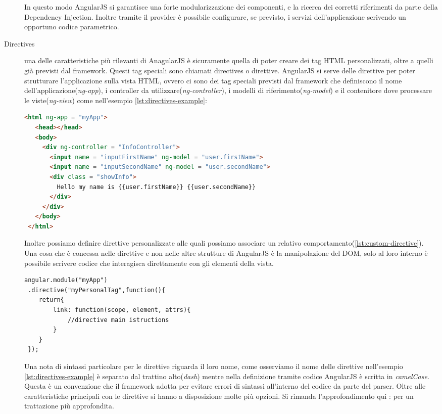 \begin{description}
In questo modo AngularJS si garantisce una forte modularizzazione dei componenti, e la ricerca dei corretti riferimenti da parte della Dependency Injection. Inoltre tramite il provider è possibile configurare, se previsto, i servizi dell'applicazione scrivendo un opportuno codice parametrico.

\item[Directives] una delle caratteristiche più rilevanti di AnagularJS è sicuramente quella di poter creare dei tag HTML personalizzati, oltre a quelli già previsti dal framework. Questi tag speciali sono chiamati directives o direttive. AngularJS si serve delle direttive per poter strutturare l'applicazione sulla vista HTML, ovvero ci sono dei tag speciali previsti dal framework che definiscono il nome dell'applicazione(\textit{ng-app}), i controller da utilizzare(\textit{ng-controller}), i modelli di riferimento(\textit{ng-model}) e il contenitore dove processare le viste(\textit{ng-view}) come nell'esempio \ref{lst:directives-example}:
\begin{lstlisting}[language=html,caption={Un esempio delle direttive standard di AngularJS},
				   label={lst:directives-example}]
 <html ng-app = "myApp">
   <head></head>
   <body>
     <div ng-controller = "InfoController">
       <input name = "inputFirstName" ng-model = "user.firstName">
       <input name = "inputSecondName" ng-model = "user.secondName">
       <div class = "showInfo">
	     Hello my name is {{user.firstName}} {{user.secondName}}			
       </div>
     </div>
   </body>
 </html>
\end{lstlisting}

Inoltre possiamo definire direttive personalizzate alle quali possiamo associare un relativo comportamento(\ref{lst:custom-directive}). Una cosa che è concessa nelle direttive e non nelle altre strutture di AngularJS è la manipolazione del DOM, solo al loro interno è possibile scrivere codice che interagisca direttamente con gli elementi della vista.
\begin{lstlisting}[language=html,caption={Un esempio di direttiva personalizzata},
				   label={lst:custom-directive}]
 angular.module("myApp")
 .directive("myPersonalTag",function(){
	return{
		link: function(scope, element, attrs){
			//directive main istructions		
		}	
	} 
 });
\end{lstlisting}

Una nota di sintassi particolare per le direttive riguarda il loro nome, come osserviamo il nome delle direttive nell'esempio \ref{lst:directives-example} è separato dal trattino alto(\emph{dash}) mentre nella definizione tramite codice AngularJS è scritta in \emph{camelCase}. Questa è un convenzione che il framework adotta per evitare errori di sintassi all'interno del codice da parte del parser.
Oltre alle caratteristiche principali con le direttive si hanno a disposizione molte più opzioni. Si rimanda l'approfondimento qui : \cite{angularjs:directives} per un trattazione più approfondita.

\end{description} 



